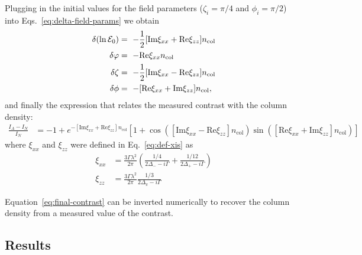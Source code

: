 Plugging in the initial values for the field parameters ($\zeta_{i}=\pi/4$ and
$\phi_{i}=\pi/2$) into Eqs.~\ref{eq:delta-field-params} we obtain
\begin{equation}
\begin{split}
 \delta( \ln\efieldo ) & = \ 
      -\frac{1}{2} [ \text{Im}\xi_{xx} + \text{Re}\xi_{zz} ] n_{\text{col}}\\ 
 \delta\varphi & = \
      -\text{Re}\xi_{xx} n_{\text{col}} \\ 
 \delta\phcChi & = \ -\frac{1}{2} 
     [ \text{Im}\xi_{xx}  - \text{Re}\xi_{zz}  ] n_{\text{col}}\\
 \delta\phi & = \
     -[ \text{Re}\xi_{xx} + \text{Im}\xi_{zz} ] n_{\text{col}}, 
\end{split}
\end{equation}
and finally the expression that relates the measured contrast with the column
density: 
\begin{equation}
\begin{split}
  \frac{ I_{A} - I_{N}}{I_{N}}   
     & = - 1 
     + e^{  -[ \text{Im}\xi_{xx} + \text{Re}\xi_{zz} ] n_{\text{col}} } 
      \left[ 1 
        +\cos( [ \text{Im}\xi_{xx} - \text{Re}\xi_{zz} ] n_{\text{col}} ) 
         \sin( [ \text{Re}\xi_{xx} + \text{Im}\xi_{zz} ] n_{\text{col}} )  \right]
\end{split}
\label{eq:final-contrast}
\end{equation}
where $\xi_{xx}$ and $\xi_{zz}$ were defined in Eq.~\ref{eq:def-xis} as  
\begin{equation}
\begin{split}
   \xi_{xx} & = 
    \frac{ 3  \Gamma \lambda^{2}}{ 2 \pi}
       \left( \frac{1/4}{2\Delta_{-} - i \Gamma } 
            + \frac{1/12}{2\Delta_{+} - i \Gamma }  
       \right)  \\
   \xi_{zz} & = 
    \frac{ 3  \Gamma \lambda^{2}}{ 2 \pi}
              \frac{1/3}{2\Delta_{\pi} - i \Gamma } 
\end{split}
\end{equation}

Equation~\ref{eq:final-contrast} can be inverted numerically to recover the
column density from a measured value of the contrast.

\subsection{ Results } 

